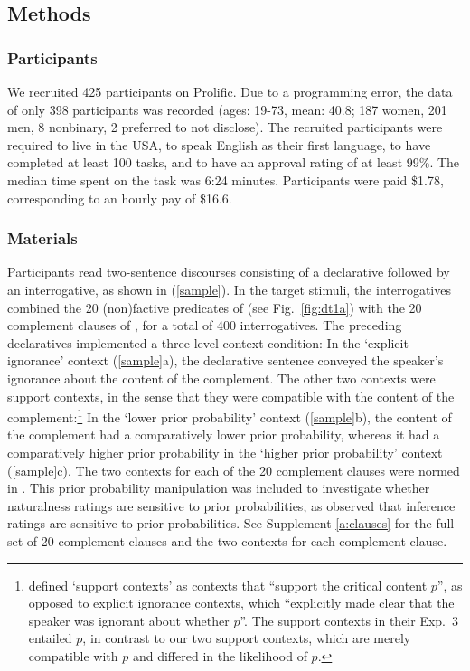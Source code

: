 \documentclass[11pt,fleqn]{article}
\newcommand{\6}{\mbox{$[\hspace*{-.6mm}[$}}
\newcommand{\9}{\mbox{$]\hspace*{-.6mm}]$}}
\begin{document}
\subsection{Methods}\label{s-methods}

\subsubsection{Participants}

We recruited 425 participants on Prolific. Due to a programming error, the data of only 398 participants was recorded (ages: 19-73, mean: 40.8; 187 women, 201 men, 8 nonbinary, 2 preferred to not disclose). The recruited participants were required to live in the USA, to speak English as their first language, to have completed at least 100 tasks, and to have an approval rating of at least 99\%. The median time spent on the task was 6:24 minutes. Participants were paid \$1.78, corresponding to an hourly pay of \$16.6.


\subsubsection{Materials}

Participants read two-sentence discourses consisting of a declarative followed by an interrogative, as shown in (\ref{sample}). In the target stimuli, the interrogatives combined the 20 (non)factive predicates of \citealt{degen-tonhauser-language} (see Fig.~\ref{fig:dt1a}) with the 20 complement clauses of \citealt{degen-tonhauser-language}, for a total of 400 interrogatives. The preceding declaratives implemented a three-level context condition: In the `explicit ignorance' context (\ref{sample}a), the declarative sentence conveyed the speaker's ignorance about the content of the complement. The other two contexts were support contexts, in the sense that they were compatible with the content of the complement:\footnote{\label{fn:contexts}\citealt[490]{mandelkern-etal2020} defined `support contexts' as contexts that ``support the critical content $p$'', as opposed to explicit ignorance contexts, which ``explicitly made clear that the speaker was ignorant about whether $p$''. The support contexts in their Exp.~3 entailed $p$, in contrast to our two support contexts, which are merely compatible with $p$ and differed in the likelihood of $p$.} In the `lower prior probability' context (\ref{sample}b), the content of the complement had a comparatively lower prior probability, whereas it had a comparatively higher prior probability in the `higher prior probability' context (\ref{sample}c). The two contexts for each of the 20 complement clauses were normed in \citealt{degen-tonhauser-openmind}. This prior probability manipulation was included to investigate whether naturalness ratings are sensitive to prior probabilities, as \citealt{degen-tonhauser-openmind} observed that inference ratings are sensitive to prior probabilities. See Supplement \ref{a:clauses} for the full set of 20 complement clauses and the two contexts for each complement clause.
\end{document}
